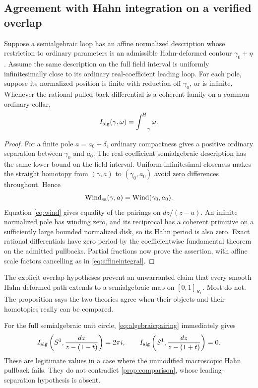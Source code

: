 \documentclass[11pt,letterpaper]{article}
\theoremstyle{definition}
\theoremstyle{remark}
\newcommand{\HInt}{\mathop{\int^{\!H}}\nolimits}
\numberwithin{equation}{section}
\begin{document}
\subsection{Agreement with Hahn integration on a verified overlap}
\begin{proposition}\label{prop:comparison}
Suppose a semialgebraic loop has an affine normalized description whose restriction to ordinary parameters is an admissible Hahn-deformed contour $\gamma_0+\eta$. Assume the same description on the full field interval is uniformly infinitesimally close to its ordinary real-coefficient leading loop. For each pole, suppose its normalized position is finite with reduction off $\gamma_0$, or is infinite. Whenever the rational pulled-back differential is a coherent family on a common ordinary collar,
\[
 I_{\rm alg}(\gamma,\omega)=\HInt_\gamma\omega.
\]
\end{proposition}
\begin{proof}
For a finite pole $a=a_0+\delta$, ordinary compactness gives a positive ordinary separation between $\gamma_0$ and $a_0$. The real-coefficient semialgebraic description has the same lower bound on the field interval. Uniform infinitesimal closeness makes the straight homotopy from $(\gamma,a)$ to $(\gamma_0,a_0)$ avoid zero differences throughout. Hence
\[
 \operatorname{Wind}_{\rm sa}(\gamma,a)=\operatorname{Wind}(\gamma_0,a_0).
\]
Equation \eqref{eq:wind} gives equality of the pairings on $dz/(z-a)$. An infinite normalized pole has winding zero, and its reciprocal has a coherent primitive on a sufficiently large bounded normalized disk, so its Hahn period is also zero. Exact rational differentials have zero period by the coefficientwise fundamental theorem on the admitted pullbacks. Partial fractions now prove the assertion, with affine scale factors cancelling as in \eqref{eq:affineintegral}.
\end{proof}

The explicit overlap hypotheses prevent an unwarranted claim that every smooth Hahn-deformed path extends to a semialgebraic map on $[0,1]_{R_\Gamma}$. Most do not. The proposition says the two theories agree when their objects and their homotopies really can be compared.

For the full semialgebraic unit circle, \eqref{eq:algebraicpairing} immediately gives
\[
 I_{\rm alg}\left(S^1,\frac{dz}{z-(1-t)}\right)=2\pi i,\qquad
 I_{\rm alg}\left(S^1,\frac{dz}{z-(1+t)}\right)=0.
\]
These are legitimate values in a case where the unmodified macroscopic Hahn pullback fails. They do not contradict \cref{prop:comparison}, whose leading-separation hypothesis is absent.
\end{document}
